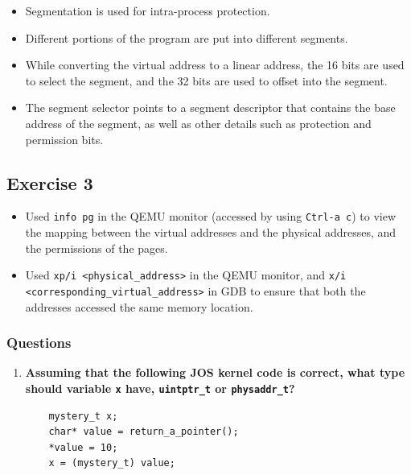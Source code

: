 \documentclass[]{article}
\begin{document}
\begin{itemize}
  \begin{itemize}
  \itemsep1pt\parskip0pt
  \item
    Segmentation is used for intra-process protection.
  \item
    Different portions of the program are put into different segments.
  \item
    While converting the virtual address to a linear address, the 16
    bits are used to select the segment, and the 32 bits are used to
    offset into the segment.
  \item
    The segment selector points to a segment descriptor that contains
    the base address of the segment, as well as other details such as
    protection and permission bits.
  \end{itemize}
\end{itemize}

\subsection{Exercise 3}

\begin{itemize}
\itemsep1pt\parskip0pt
\item
  Used \texttt{info pg} in the QEMU monitor (accessed by using
  \texttt{Ctrl-a c}) to view the mapping between the virtual addresses
  and the physical addresses, and the permissions of the pages.
\item
  Used \texttt{xp/i \textless{}physical\_address\textgreater{}} in the
  QEMU monitor, and
  \texttt{x/i \textless{}corresponding\_virtual\_address\textgreater{}}
  in GDB to ensure that both the addresses accessed the same memory
  location.
\end{itemize}

\subsubsection{Questions}

\begin{enumerate}
\def\labelenumi{\arabic{enumi}.}
\item
  \textbf{Assuming that the following JOS kernel code is correct, what
  type should variable \texttt{x} have, \texttt{uintptr\_t} or
  \texttt{physaddr\_t}?}

\begin{verbatim}
    mystery_t x;
    char* value = return_a_pointer();
    *value = 10;
    x = (mystery_t) value;
\end{verbatim}
\end{enumerate}
\end{document}
